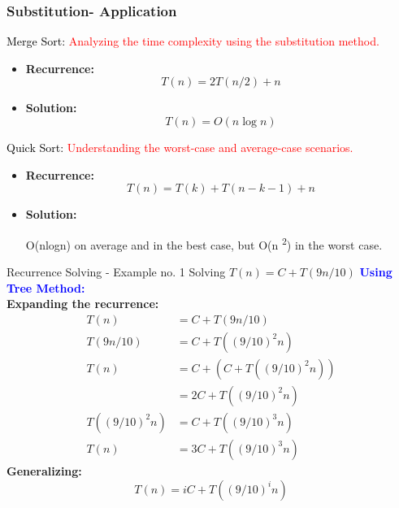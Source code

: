 \begin{frame}
    \frametitle{Substitution- Application}
    \vspace{0.4cm} %
\begin{block}{\textcolor{black}{Merge Sort: \textcolor{red}{Analyzing the time complexity using the substitution method.}}}


    \end{block}
\begin{itemize}
    \item \textbf{Recurrence:}  
    \[
    T(n) = 2T(n/2) + n
    \]

    \item \textbf{Solution:}  
    \[
    T(n) = O(n \log n)
    \]
\end{itemize}

\begin{block}{\textcolor{black}{Quick Sort: \textcolor{red}{Understanding the worst-case and average-case scenarios.}}}


    \end{block}

\begin{itemize}
    \item \textbf{Recurrence:}  
    \[
    T(n) = T(k) + T(n - k - 1) + n
    \]
\item \textbf{Solution:}

O(nlogn) on average and in the best case, but 
O(n \textsuperscript{2}) in the worst case.



\end{itemize}






\end{frame}





\begin{frame}{Recurrence Solving - Example no. 1}
    {Solving $T(n) = C + T(9n/10)$}
    \textbf{\textcolor{blue}{Using Tree Method:}}\\
    \vspace{0.2cm}
    \textbf{Expanding the recurrence:}
    \begin{align*}
        T(n) &= C + T(9n/10) \\
        T(9n/10) &= C + T((9/10)^2 n) \\
        T(n) &= C + \left( C + T((9/10)^2 n) \right) \\
              &= 2C + T((9/10)^2 n) \\
        T((9/10)^2 n) &= C + T((9/10)^3 n) \\
        T(n) &= 3C + T((9/10)^3 n)
    \end{align*}
    \textbf{Generalizing:}
    \begin{equation*}
        T(n) = iC + T((9/10)^i n)
    \end{equation*}
\end{frame}

